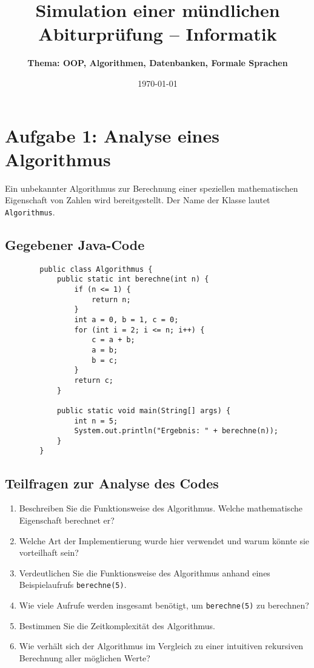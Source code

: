 \documentclass[a4paper,12pt]{article}
\begin{document}
	
	\title{\textbf{Simulation einer mündlichen Abiturprüfung -- Informatik}}
	\author{\textbf{Thema: OOP, Algorithmen, Datenbanken, Formale Sprachen}}
	\date{\today}
	\maketitle
	
	\section*{Aufgabe 1: Analyse eines Algorithmus}
	
	Ein unbekannter Algorithmus zur Berechnung einer speziellen mathematischen Eigenschaft von Zahlen wird bereitgestellt. Der Name der Klasse lautet \texttt{Algorithmus}.
	
	\subsection*{Gegebener Java-Code}
	
	\begin{verbatim}
		public class Algorithmus {
			public static int berechne(int n) {
				if (n <= 1) {
					return n;
				}
				int a = 0, b = 1, c = 0;
				for (int i = 2; i <= n; i++) {
					c = a + b;
					a = b;
					b = c;
				}
				return c;
			}
			
			public static void main(String[] args) {
				int n = 5;
				System.out.println("Ergebnis: " + berechne(n));
			}
		}
	\end{verbatim}
	
	\subsection*{Teilfragen zur Analyse des Codes}
	
	\begin{enumerate}
		\item Beschreiben Sie die Funktionsweise des Algorithmus. Welche mathematische Eigenschaft berechnet er?		
		\item Welche Art der Implementierung wurde hier verwendet und warum könnte sie vorteilhaft sein?
		\item Verdeutlichen Sie die Funktionsweise des Algorithmus anhand eines Beispielaufrufs \texttt{berechne(5)}.
		\item Wie viele Aufrufe werden insgesamt benötigt, um \texttt{berechne(5)} zu berechnen?
		\item Bestimmen Sie die Zeitkomplexität des Algorithmus.		
		\item Wie verhält sich der Algorithmus im Vergleich zu einer intuitiven rekursiven Berechnung aller möglichen Werte?
		
	\end{enumerate}
	
\end{document}
